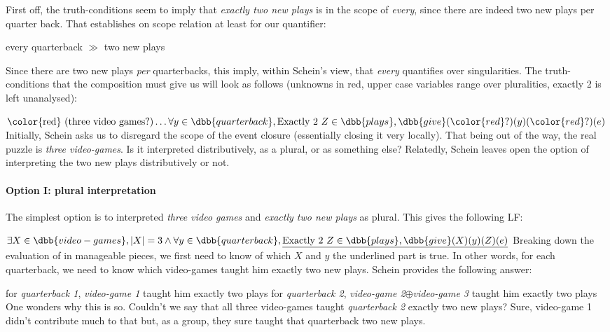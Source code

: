 \documentclass[english]{article}
\begin{document}
First off, the truth-conditions seem to imply that \emph{exactly two new plays} is in the scope of \emph{every}, since there are indeed two new plays per quarter back. That establishes on scope relation at least for our quantifier:

\begin{center}
every quarterback $\gg$ two new plays
\end{center}
%
Since there are two new plays \emph{per} quarterbacks, this imply, within Schein's view, that \emph{every} quantifies over singularities. The truth-conditions that the composition must give us will look as follows (unknowns in red, upper case variables range over pluralities, exactly 2 is left unanalysed):

\ex
$\text{\color{red} (three video games?)} \ldots \forall y\in \dbb{quarterback}, \text{Exactly 2 } Z\in \dbb{plays},  \dbb{give}({\color{red} ?})(y)({\color{red} ?})(e)$
\xe
%
Initially, Schein asks us to disregard the scope of the event closure (essentially closing it very locally). That being out of the way,
the real puzzle is \emph{three video-games}. Is it interpreted distributively, as a plural, or as something else? Relatedly, Schein leaves open the option of interpreting the two new plays distributively or not.

\paragraph{Option I: plural interpretation} The simplest option is to interpreted \emph{three video games} and \emph{exactly two new plays} as plural. This gives the following LF:

\ex\label{lf1}
$\exists X\in \dbb{video-games}, |X| = 3 \wedge \forall y\in \dbb{quarterback}, \underline{\text{Exactly 2 } Z\in \dbb{plays},  \dbb{give}(X)(y)(Z)(e)}$
\xe
%
Breaking down the evaluation of \clastx in manageable pieces, we first need to know of which $X$ and $y$ the underlined part is true. In other words, for each quarterback, we need to know which video-games taught him exactly two new plays. Schein provides the following answer:

\pex
\a for \emph{quarterback 1}, \emph{video-game 1} taught him exactly two plays
\a for \emph{quarterback 2}, \emph{video-game 2}$\oplus$\emph{video-game 3} taught him exactly two plays
\xe
%
One wonders why this is so. Couldn't we say that all three video-games taught \emph{quarterback 2} exactly two new plays? Sure, video-game 1 didn't contribute much to that but, as a group, they sure taught that quarterback two new plays.
\end{document}
